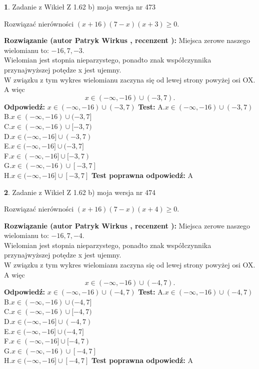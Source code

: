 \documentclass[12pt, a4paper]{article}
\theoremstyle{definition} %
\newtheorem{zad}{}
\newcommand{\zadStart}[1]{\begin{zad}#1\newline}
\newcommand{\zadStop}{\end{zad}}
\newcommand{\rozwStart}[2]{\noindent \textbf{Rozwiązanie (autor #1 , recenzent #2): }\newline}
\newcommand{\rozwStop}{\newline}
\newcommand{\odpStart}{\noindent \textbf{Odpowiedź:}\newline}
\newcommand{\odpStop}{\newline}
\newcommand{\testStart}{\noindent \textbf{Test:}\newline}
\newcommand{\testStop}{\newline}
\newcommand{\kluczStart}{\noindent \textbf{Test poprawna odpowiedź:}\newline}
\newcommand{\kluczStop}{\newline}
\begin{document}
\zadStart{Zadanie z Wikieł Z 1.62 b) moja wersja nr 473}

Rozwiązać nierówności $(x+16)(7-x)(x+3)\ge0$.
\zadStop
\rozwStart{Patryk Wirkus}{}
Miejsca zerowe naszego wielomianu to: $-16, 7, -3$.\\
Wielomian jest stopnia nieparzystego, ponadto znak współczynnika przy\linebreak najwyższej potędze x jest ujemny.\\ W związku z tym wykres wielomianu zaczyna się od lewej strony powyżej osi OX. A więc $$x \in (-\infty,-16) \cup (-3,7).$$
\rozwStop
\odpStart
$x \in (-\infty,-16) \cup (-3,7)$
\odpStop
\testStart
A.$x \in (-\infty,-16) \cup (-3,7)$\\
B.$x \in (-\infty,-16) \cup (-3,7]$\\
C.$x \in (-\infty,-16) \cup [-3,7)$\\
D.$x \in (-\infty,-16] \cup (-3,7)$\\
E.$x \in (-\infty,-16] \cup (-3,7]$\\
F.$x \in (-\infty,-16] \cup [-3,7)$\\
G.$x \in (-\infty,-16) \cup [-3,7]$\\
H.$x \in (-\infty,-16] \cup [-3,7]$
\testStop
\kluczStart
A
\kluczStop



\zadStart{Zadanie z Wikieł Z 1.62 b) moja wersja nr 474}

Rozwiązać nierówności $(x+16)(7-x)(x+4)\ge0$.
\zadStop
\rozwStart{Patryk Wirkus}{}
Miejsca zerowe naszego wielomianu to: $-16, 7, -4$.\\
Wielomian jest stopnia nieparzystego, ponadto znak współczynnika przy\linebreak najwyższej potędze x jest ujemny.\\ W związku z tym wykres wielomianu zaczyna się od lewej strony powyżej osi OX. A więc $$x \in (-\infty,-16) \cup (-4,7).$$
\rozwStop
\odpStart
$x \in (-\infty,-16) \cup (-4,7)$
\odpStop
\testStart
A.$x \in (-\infty,-16) \cup (-4,7)$\\
B.$x \in (-\infty,-16) \cup (-4,7]$\\
C.$x \in (-\infty,-16) \cup [-4,7)$\\
D.$x \in (-\infty,-16] \cup (-4,7)$\\
E.$x \in (-\infty,-16] \cup (-4,7]$\\
F.$x \in (-\infty,-16] \cup [-4,7)$\\
G.$x \in (-\infty,-16) \cup [-4,7]$\\
H.$x \in (-\infty,-16] \cup [-4,7]$
\testStop
\kluczStart
A
\kluczStop
\end{document}
